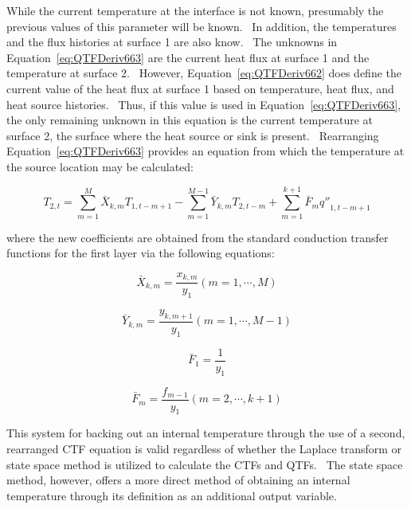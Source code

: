 While the current temperature at the interface is not known, presumably the previous values of this parameter will be known.~ In addition, the temperatures and the flux histories at surface 1 are also know.~ The unknowns in Equation~\ref{eq:QTFDeriv663} are the current heat flux at surface 1 and the temperature at surface 2.~ However, Equation~\ref{eq:QTFDeriv662} does define the current value of the heat flux at surface 1 based on temperature, heat flux, and heat source histories.~ Thus, if this value is used in Equation~\ref{eq:QTFDeriv663}, the only remaining unknown in this equation is the current temperature at surface 2, the surface where the heat source or sink is present.~ Rearranging Equation~\ref{eq:QTFDeriv663} provides an equation from which the temperature at the source location may be calculated:

\begin{equation}
{T_{2,t}} = \sum\limits_{m = 1}^M {{{\bar X}_{k,m}}{T_{1,t - m + 1}}}  - \sum\limits_{m = 1}^{M - 1} {{{\bar Y}_{k,m}}{T_{2,t - m}}}  + \sum\limits_{m = 1}^{k + 1} {{{\bar F}_m}{{q''}_{1,t - m + 1}}}
\end{equation}

where the new coefficients are obtained from the standard conduction transfer functions for the first layer via the following equations:

\begin{equation}
{\bar X_{k,m}} = \frac{{{x_{k,m}}}}{{{y_1}}}\left( {m = 1, \cdots ,M} \right)
\end{equation}

\begin{equation}
{\bar Y_{k,m}} = \frac{{{y_{k,m + 1}}}}{{{y_1}}}\left( {m = 1, \cdots ,M - 1} \right)
\end{equation}

\begin{equation}
{\bar F_1} = \frac{1}{{{y_1}}}
\end{equation}

\begin{equation}
{\bar F_m} = \frac{{{f_{m - 1}}}}{{{y_1}}}\left( {m = 2, \cdots ,k + 1} \right)
\end{equation}

This system for backing out an internal temperature through the use of a second, rearranged CTF equation is valid regardless of whether the Laplace transform or state space method is utilized to calculate the CTFs and QTFs.~ The state space method, however, offers a more direct method of obtaining an internal temperature through its definition as an additional output variable.

